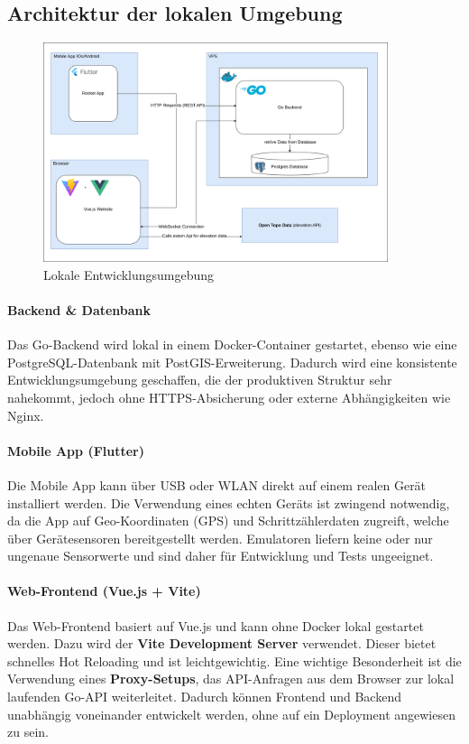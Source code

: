 \documentclass[11pt,a4paper]{article}
\begin{document}
\subsection*{Architektur der lokalen Umgebung}
\begin{figure}[H]
    \centering
    \includegraphics[width=0.9\textwidth]{images/Architecture.png}
    \caption{Lokale Entwicklungsumgebung}
    \label{fig:local-architektur}
\end{figure}

\paragraph{Backend \& Datenbank}
Das Go-Backend wird lokal in einem Docker-Container gestartet, ebenso wie eine PostgreSQL-Datenbank mit PostGIS-Erweiterung. Dadurch wird eine konsistente Entwicklungsumgebung geschaffen, die der produktiven Struktur sehr nahekommt, jedoch ohne HTTPS-Absicherung oder externe Abhängigkeiten wie Nginx.

\paragraph{Mobile App (Flutter)}
Die Mobile App kann über USB oder WLAN direkt auf einem realen Gerät installiert werden. Die Verwendung eines echten Geräts ist zwingend notwendig, da die App auf Geo-Koordinaten (GPS) und Schrittzählerdaten zugreift, welche über Gerätesensoren bereitgestellt werden. Emulatoren liefern keine oder nur ungenaue Sensorwerte und sind daher für Entwicklung und Tests ungeeignet.

\paragraph{Web-Frontend (Vue.js + Vite)}
Das Web-Frontend basiert auf Vue.js und kann ohne Docker lokal gestartet werden. Dazu wird der \textbf{Vite Development Server} verwendet. Dieser bietet schnelles Hot Reloading und ist leichtgewichtig. Eine wichtige Besonderheit ist die Verwendung eines \textbf{Proxy-Setups}, das API-Anfragen aus dem Browser zur lokal laufenden Go-API weiterleitet. Dadurch können Frontend und Backend unabhängig voneinander entwickelt werden, ohne auf ein Deployment angewiesen zu sein.
\end{document}
